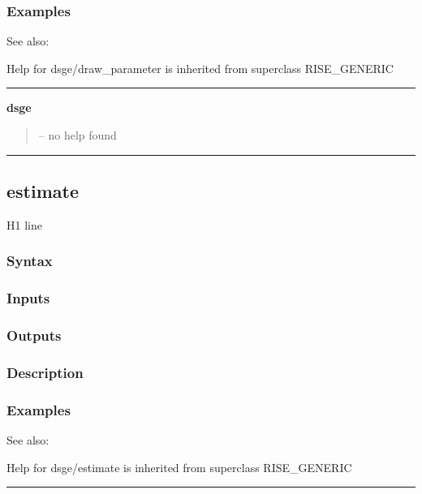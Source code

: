 \documentclass[letterpaper,10pt,english]{sphinxmanual}
\begin{document}
\subsubsection{Examples}
\label{classes/models/@dsge/dsge:id25}
See also:

Help for dsge/draw\_parameter is inherited from superclass RISE\_GENERIC


\bigskip\hrule{}\bigskip

\label{classes/models/@dsge/dsge:dsge}
\textbf{dsge}
\begin{quote}

-- no help found
\end{quote}


\bigskip\hrule{}\bigskip



\subsection{estimate}
\label{classes/models/@dsge/dsge:estimate}\label{classes/models/@dsge/dsge:id26}
H1 line


\subsubsection{Syntax}
\label{classes/models/@dsge/dsge:id27}

\subsubsection{Inputs}
\label{classes/models/@dsge/dsge:id28}

\subsubsection{Outputs}
\label{classes/models/@dsge/dsge:id29}

\subsubsection{Description}
\label{classes/models/@dsge/dsge:id30}

\subsubsection{Examples}
\label{classes/models/@dsge/dsge:id31}
See also:

Help for dsge/estimate is inherited from superclass RISE\_GENERIC


\bigskip\hrule{}\bigskip
\end{document}

